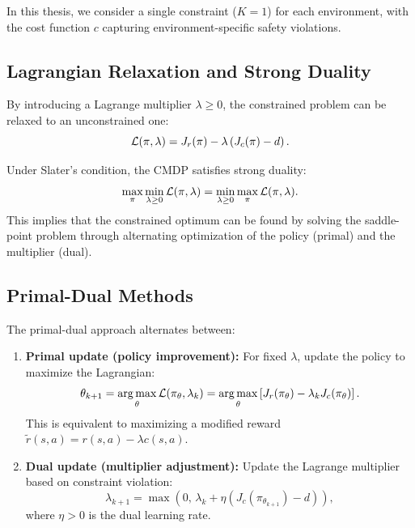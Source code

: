 In this thesis, we consider a single constraint ($K = 1$) for each environment, with the cost function $c$ capturing environment-specific safety violations.

\subsection{Lagrangian Relaxation and Strong Duality}

By introducing a Lagrange multiplier $\lambda \geq 0$, the constrained problem can be relaxed to an unconstrained one:
\begin{equation}
    \mathcal{L}(\pi, \lambda) = J_r(\pi) - \lambda \left(J_c(\pi) - d\right).
\end{equation}

\begin{proposition}
Under Slater's condition, the CMDP satisfies strong duality:
\begin{equation}
    \max_{\pi} \min_{\lambda \geq 0} \mathcal{L}(\pi, \lambda) = \min_{\lambda \geq 0} \max_{\pi} \mathcal{L}(\pi, \lambda).
\end{equation}
This implies that the constrained optimum can be found by solving the saddle-point problem through alternating optimization of the policy (primal) and the multiplier (dual).
\end{proposition}

\subsection{Primal-Dual Methods}

The primal-dual approach alternates between:

\begin{enumerate}
    \item \textbf{Primal update (policy improvement):} For fixed $\lambda$, update the policy to maximize the Lagrangian:
    \begin{equation}
        \theta_{k+1} = \operatorname*{arg\,max}_\theta \mathcal{L}(\pi_\theta, \lambda_k) = \operatorname*{arg\,max}_\theta \left[J_r(\pi_\theta) - \lambda_k J_c(\pi_\theta)\right].
        \label{eq:primal}
    \end{equation}
    This is equivalent to maximizing a modified reward $\tilde{r}(s, a) = r(s, a) - \lambda c(s, a)$.

    \item \textbf{Dual update (multiplier adjustment):} Update the Lagrange multiplier based on constraint violation:
    \begin{equation}
        \lambda_{k+1} = \max\!\left(0, \, \lambda_k + \eta \left(J_c(\pi_{\theta_{k+1}}) - d\right)\right),
        \label{eq:dual}
    \end{equation}
    where $\eta > 0$ is the dual learning rate.
\end{enumerate}

